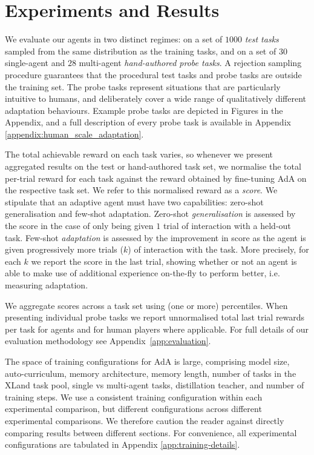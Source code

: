 \section{Experiments and Results}

We evaluate our agents in two distinct regimes: on a set of $1000$ \textit{test tasks} sampled from the same distribution as the training tasks, and on a set of $30$ single-agent and $28$ multi-agent \emph{hand-authored probe tasks}. A rejection sampling procedure guarantees that the procedural test tasks and probe tasks are outside the training set. The probe tasks represent situations that are particularly intuitive to humans, and deliberately cover a wide range of qualitatively different adaptation behaviours. Example probe tasks are depicted in Figures  in the Appendix, and a full description of every probe task is available in Appendix \ref{appendix:human_scale_adaptation}. 

The total achievable reward on each task varies, so whenever we present aggregated results on the test or hand-authored task set, we normalise the total per-trial reward for each task against the reward obtained by fine-tuning AdA on the respective task set. We refer to this normalised reward as a \textit{score}. We stipulate that an adaptive agent must have two capabilities: zero-shot generalisation and few-shot adaptation. Zero-shot \textit{generalisation} is assessed by the score in the case of only being given $1$ trial of interaction with a held-out task. Few-shot \textit{adaptation} is assessed by the improvement in score as the agent is given progressively more trials ($k$) of interaction with the task. More precisely, for each $k$ we report the score in the last trial, showing whether or not an agent is able to make use of additional experience on-the-fly to perform better, i.e. measuring adaptation. 

We aggregate scores across a task set using (one or more) percentiles. When presenting individual probe tasks we report unnormalised total last trial rewards per task for agents and for human players where applicable. For full details of our evaluation methodology see Appendix~\ref{app:evaluation}. 

The space of training configurations for AdA is large, comprising model size, auto-curriculum, memory architecture, memory length, number of tasks in the XLand task pool, single vs multi-agent tasks, distillation teacher, and number of training steps. We use a consistent training configuration within each experimental comparison, but different configurations across different experimental comparisons. We therefore caution the reader against directly comparing results between different sections. For convenience, all experimental configurations are tabulated in Appendix \ref{app:training-details}.


